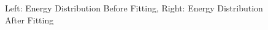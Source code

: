 \begin{figure}%
    \centering
    \qquad
    \caption{Left: Energy Distribution Before Fitting, Right: Energy Distribution After Fitting}%
    \label{fig:patKennyPlots}%
\end{figure}
